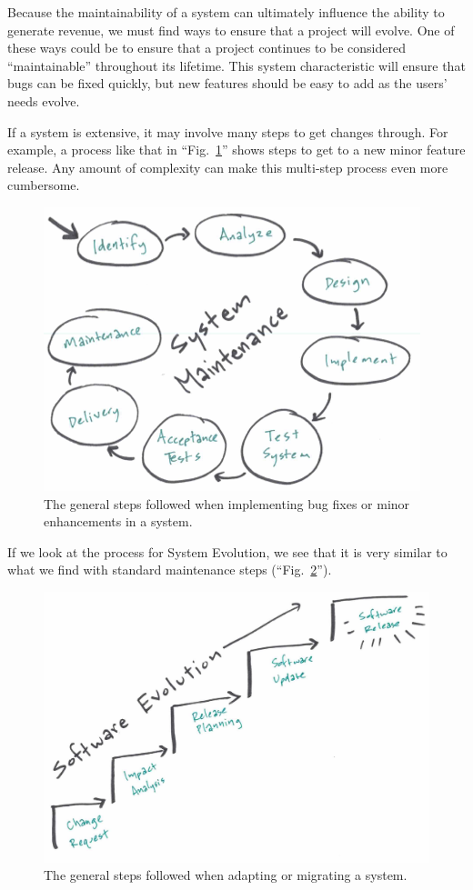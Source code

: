 \documentclass[12pt,conference]{IEEEtran}
\begin{document}

Because the maintainability of a system can ultimately influence the ability to generate revenue, we must find ways to ensure that a project will evolve. One of these ways could be to ensure that a project continues to be considered ``maintainable'' throughout its lifetime. This system characteristic will ensure that bugs can be fixed quickly, but new features should be easy to add as the users' needs evolve.

If a system is extensive, it may involve many steps to get changes through. For example, a process like that in ``Fig.~\ref{figSystemMaintenance}'' shows steps to get to a new minor feature release. Any amount of complexity can make this multi-step process even more cumbersome.

\begin{figure}[ht]
    \centerline{
        \includegraphics[width=0.8\columnwidth]{Maintenance}
    }
    \caption{The general steps followed when implementing bug fixes or minor enhancements in a system.}
    \label{figSystemMaintenance}
\end{figure}

If we look at the process for System Evolution, we see that it is very similar to what we find with standard maintenance steps (``Fig.~\ref{figSystemEvolution}'').

\begin{figure}[ht]
    \centerline{
        \includegraphics[width=0.8\columnwidth]{Evolution}
    }
    \caption{The general steps followed when adapting or migrating a system.}
    \label{figSystemEvolution}
\end{figure}
\end{document}
